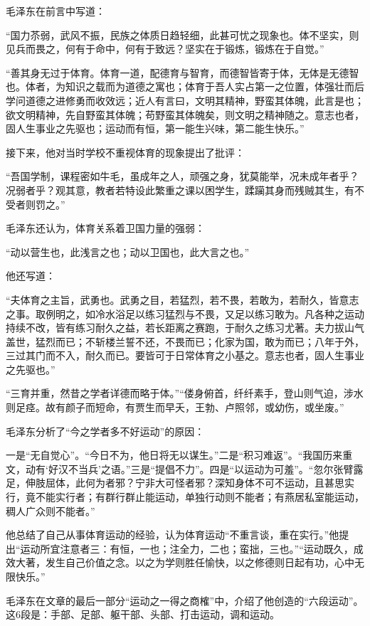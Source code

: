 \documentclass[../../dazhuan.tex]{subfiles}
\begin{document}
毛泽东在前言中写道：

“国力苶弱，武风不振，民族之体质日趋轻细，此甚可忧之现象也。体不坚实，则见兵而畏之，何有于命中，何有于致远？坚实在于锻炼，锻炼在于自觉。”

“善其身无过于体育。体育一道，配德育与智育，而德智皆寄于体，无体是无德智也。体者，为知识之载而为道德之寓也；体育于吾人实占第一之位置，体强壮而后学问道德之进修勇而收效远；近人有言曰，文明其精神，野蛮其体魄，此言是也；欲文明精神，先自野蛮其体魄；苟野蛮其体魄矣，则文明之精神随之。意志也者，固人生事业之先驱也；运动而有恒，第一能生兴味，第二能生快乐。”

接下来，他对当时学校不重视体育的现象提出了批评： 

“吾国学制，课程密如牛毛，虽成年之人，顽强之身，犹莫能举，况未成年者乎？况弱者乎？观其意，教者若特设此繁重之课以困学生，蹂躏其身而残贼其生，有不受者则罚之。”

毛泽东还认为，体育关系着卫国力量的强弱：

“动以营生也，此浅言之也；动以卫国也，此大言之也。”

他还写道：

“夫体育之主旨，武勇也。武勇之目，若猛烈，若不畏，若敢为，若耐久，皆意志之事。取例明之，如冷水浴足以练习猛烈与不畏，又足以练习敢为。凡各种之运动持续不改，皆有练习耐久之益，若长距离之赛跑，于耐久之练习尤著。夫力拔山气盖世，猛烈而已；不斩楼兰誓不还，不畏而已；化家为国，敢为而已；八年于外，三过其门而不入，耐久而已。要皆可于日常体育之小基之。意志也者，固人生事业之先驱也。”

“三育并重，然昔之学者详德而略于体。”“偻身俯首，纤纤素手，登山则气迫，涉水则足痉。故有颜子而短命，有贾生而早夭，王勃、卢照邻，或幼伤，或坐废。”

毛泽东分析了“今之学者多不好运动”的原因：

一是“无自觉心”。“今日不为，他日将无以谋生。”二是“积习难返”。“我国历来重文，动有‘好汉不当兵’之语。”三是“提倡不力”。四是“以运动为可羞”。“忽尔张臂露足，伸肢屈体，此何为者邪？宁非大可怪者邪？深知身体不可不运动，且甚思实行，竟不能实行者；有群行群止能运动，单独行动则不能者；有燕居私室能运动，稠人广众则不能者。”

他总结了自己从事体育运动的经验，认为体育运动“不重言谈，重在实行。”他提出“运动所宜注意者三：有恒，一也；注全力，二也；蛮拙，三也。”“运动既久，成效大著，发生自己价值之念。以之为学则胜任愉快，以之修德则日起有功，心中无限快乐。”

毛泽东在文章的最后一部分“运动之一得之商榷”中，介绍了他创造的“六段运动”。这6段是：手部、足部、躯干部、头部、打击运动，调和运动。
\end{document}
